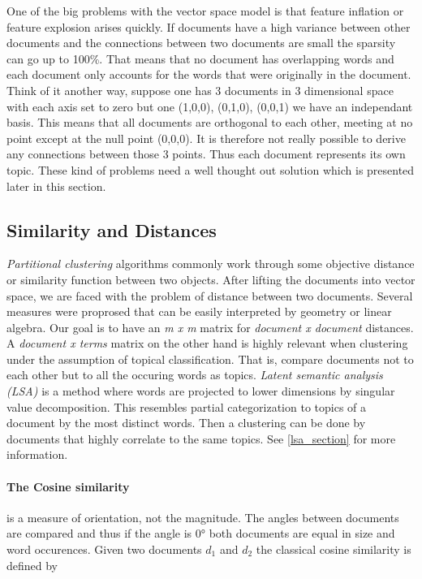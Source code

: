     One of the big problems with the vector space model is that feature inflation or feature explosion arises quickly. If documents have a high variance between other documents and the connections between two documents are small the sparsity can go up to 100\%. That means that no document has overlapping words and each document only accounts for the words that were originally in the document. Think of it another way, suppose one has 3 documents in 3 dimensional space with each axis set to zero but one (1,0,0), (0,1,0), (0,0,1) we have an independant basis. This means that all documents are orthogonal to each other, meeting at no point except at the null point (0,0,0). It is therefore not really possible to derive any connections between those 3 points. Thus each document represents its own topic.
    These kind of problems need a well thought out solution which is presented later in this section.

  \subsection{Similarity and Distances}
    \emph{Partitional clustering} algorithms commonly work through some objective distance or similarity function between two objects. After lifting the documents into vector space, we are faced with the problem of distance between two documents. Several measures were proprosed that can be easily interpreted by geometry or linear algebra. Our goal is to have an \emph{m x m} matrix for \emph{document x document} distances. A \emph{document x terms} matrix on the other hand is highly relevant when clustering under the assumption of topical classification. That is, compare documents not to each other but to all the occuring words as topics. \emph{Latent semantic analysis (LSA)} is a method where words are projected to lower dimensions by singular value decomposition. This resembles partial categorization to topics of a document by the most distinct words. Then a clustering can be done by documents that highly correlate to the same topics. See \ref{lsa_section} for more information.

    \paragraph{The Cosine similarity} is a measure of orientation, not the magnitude. The angles between documents are compared and thus if the angle is $0°$ both documents are equal in size and word occurences. Given two documents $d_1$ and $d_2$ the classical cosine similarity is defined by

